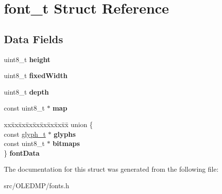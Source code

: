 \hypertarget{structfont__t}{}\section{font\+\_\+t Struct Reference}
\label{structfont__t}
\subsection*{Data Fields}
\begin{DoxyCompactItemize}
\item 
uint8\+\_\+t {\bfseries height}\hypertarget{structfont__t_adcf201a8aabf55cb352ec05331242594}{}\label{structfont__t_adcf201a8aabf55cb352ec05331242594}

\item 
uint8\+\_\+t {\bfseries fixed\+Width}\hypertarget{structfont__t_a0e5f53cd4ca2ff826fdc56228a05cfc4}{}\label{structfont__t_a0e5f53cd4ca2ff826fdc56228a05cfc4}

\item 
uint8\+\_\+t {\bfseries depth}\hypertarget{structfont__t_ab6f276082172be43a6041212071e377b}{}\label{structfont__t_ab6f276082172be43a6041212071e377b}

\item 
const uint8\+\_\+t $\ast$ {\bfseries map}\hypertarget{structfont__t_ac05cf7351f668b76cc50979270d1664b}{}\label{structfont__t_ac05cf7351f668b76cc50979270d1664b}

\item 
\begin{tabbing}
xx\=xx\=xx\=xx\=xx\=xx\=xx\=xx\=xx\=\kill
union \{\\
\>const \hyperlink{structglyph__t}{glyph\_t} $\ast$ {\bfseries glyphs}\\
\>const uint8\_t $\ast$ {\bfseries bitmaps}\\
\} {\bfseries fontData}\hypertarget{structfont__t_a2716a3d2e51bba457af3f092cd27e5c4}{}\label{structfont__t_a2716a3d2e51bba457af3f092cd27e5c4}
\\

\end{tabbing}\end{DoxyCompactItemize}


The documentation for this struct was generated from the following file\+:\begin{DoxyCompactItemize}
\item 
src/\+O\+L\+E\+D\+M\+P/fonts.\+h\end{DoxyCompactItemize}
